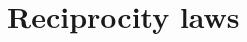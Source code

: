 \documentclass[a4paper,11pt]{amsart}
\numberwithin{equation}{section}
\theoremstyle{plain}
\newtheorem{theorem}{Theorem}[section]
\theoremstyle{definition}
\theoremstyle{remark}
\newtheorem{remark}[theorem]{Remark}
\newcommand{\I}{\mathbb{I}}
\newcommand{\defeq}{\vcentcolon=}
\DeclareMathOperator{\GL}{GL}
\newcommand{\ord}{\mathrm{ord}}
\begin{document}
 
 \section{Reciprocity laws} 

\end{document}
